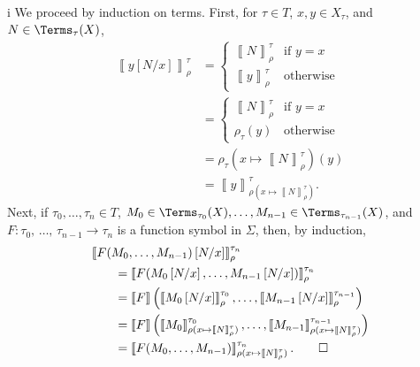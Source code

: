 \begin{partsolution}{i}
We proceed by induction on terms.
First, for \(\tau\in T\), \(x, y \in X_\tau\), and \(N \in \Terms_\tau(X)\),
\begin{align*}
\left\llbracket y\left[N/x\right]\right\rrbracket_\rho^\tau
&=\begin{cases}
\left\llbracket N\right\rrbracket_\rho^\tau & \text{if \(y = x\)} \\
\left\llbracket y\right\rrbracket_\rho^\tau & \text{otherwise}
\end{cases} \\
&=\begin{cases}
\left\llbracket N\right\rrbracket_\rho^\tau & \text{if \(y = x\)} \\
\rho_\tau(y) & \text{otherwise}
\end{cases} \\
&= \rho_\tau(x \mapsto \left\llbracket N\right\rrbracket_\rho^\tau)(y) \\
&=\left\llbracket y\right\rrbracket_{\rho(x \mapsto \left\llbracket N\right\rrbracket_\rho^\tau)}^\tau.
\end{align*}
Next, if \(\tau_0,\ldots,\tau_n\in T\), \(M_0 \in \Terms_{\tau_0}(X), \ldots, M_{n-1} \in \Terms_{\tau_{n-1}}(X)\), and \(F : \tau_0,\,\ldots,\,\tau_{n-1} \to \tau_n\) is a function symbol in \(\Sigma\), then, by induction,
\begin{align*}
&\left\llbracket F(M_0,\ldots,M_{n-1})\left[N/x\right]\right\rrbracket_\rho^{\tau_n} \\
&\qquad=\left\llbracket F(M_0\left[N/x\right],\ldots,M_{n-1}\left[N/x\right])\right\rrbracket_\rho^{\tau_n} \\
&\qquad=\left\llbracket F\right\rrbracket\left(\left\llbracket M_0\left[N/x\right]\right\rrbracket_\rho^{\tau_0},\ldots,\left\llbracket M_{n-1}\left[N/x\right]\right\rrbracket_\rho^{\tau_{n-1}}\right) \\
&\qquad=\left\llbracket F\right\rrbracket\left(\left\llbracket M_0\right\rrbracket_{\rho(x \mapsto \left\llbracket N\right\rrbracket_\rho^\tau)}^{\tau_0},\ldots,\left\llbracket M_{n-1}\right\rrbracket_{\rho(x \mapsto \left\llbracket N\right\rrbracket_\rho^\tau)}^{\tau_{n-1}}\right) \\
&\qquad=\left\llbracket F(M_0,\ldots,M_{n-1})\right\rrbracket_{\rho(x \mapsto \left\llbracket N\right\rrbracket_\rho^\tau)}^{\tau_n}.
\qedhere
\end{align*}
\end{partsolution}
